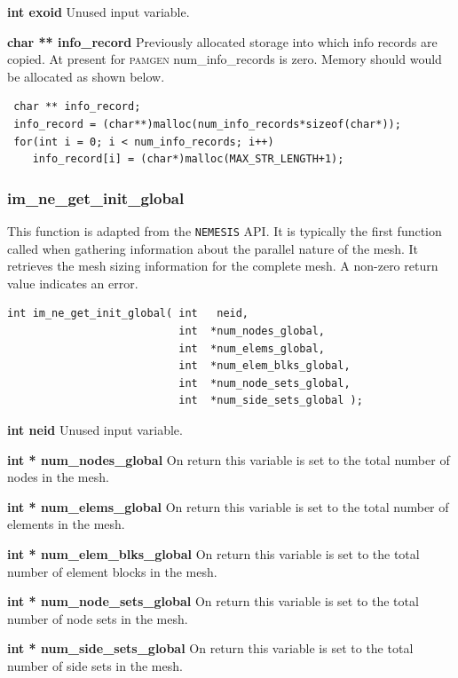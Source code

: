 {\setlength{\parindent}{0pt}
 \textbf{int exoid} Unused input variable.}

{\setlength{\parindent}{0pt}
 \textbf{char ** info\_record} Previously allocated storage into which info records are copied. At present for \textsc{pamgen} num\_info\_records is zero. Memory should would be allocated as  shown below.}
{\ttfamily  \begin{verbatim}
 char ** info_record;
 info_record = (char**)malloc(num_info_records*sizeof(char*));
 for(int i = 0; i < num_info_records; i++)
    info_record[i] = (char*)malloc(MAX_STR_LENGTH+1);
\end{verbatim}}

\subsubsection{im\_ne\_get\_init\_global}
This function is adapted from the \texttt{NEMESIS} API. It is typically the first function called when gathering information about the parallel nature of the mesh. It retrieves the mesh sizing information for the complete mesh. A non-zero return value indicates an error.
{\ttfamily  \begin{verbatim}
int im_ne_get_init_global( int   neid, 	
                           int  *num_nodes_global,
                           int  *num_elems_global,	
                           int  *num_elem_blks_global,
                           int  *num_node_sets_global,
                           int  *num_side_sets_global );
\end{verbatim}}

{\setlength{\parindent}{0pt}
 \textbf{int neid} Unused input variable.}

{\setlength{\parindent}{0pt}
 \textbf{int * num\_nodes\_global} On return this variable is set to the total number of nodes in the mesh.}

{\setlength{\parindent}{0pt}
 \textbf{int * num\_elems\_global} On return this variable is set to the total number of elements in the mesh.}

{\setlength{\parindent}{0pt}
 \textbf{int * num\_elem\_blks\_global} On return this variable is set to the total number of element blocks in the mesh.}

{\setlength{\parindent}{0pt}
 \textbf{int * num\_node\_sets\_global} On return this variable is set to the total number of node sets in the mesh.}

{\setlength{\parindent}{0pt}
 \textbf{int * num\_side\_sets\_global} On return this variable is set to the total number of side sets in the mesh.}


